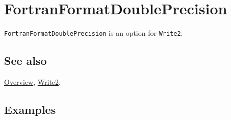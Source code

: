 \documentclass[../FeynCalcManual.tex]{subfiles}
\begin{document}
\hypertarget{fortranformatdoubleprecision}{%
\section{FortranFormatDoublePrecision}\label{fortranformatdoubleprecision}}

\texttt{FortranFormatDoublePrecision} is an option for \texttt{Write2}.

\subsection{See also}

\hyperlink{toc}{Overview}, \hyperlink{write2}{Write2}.

\subsection{Examples}
\end{document}
